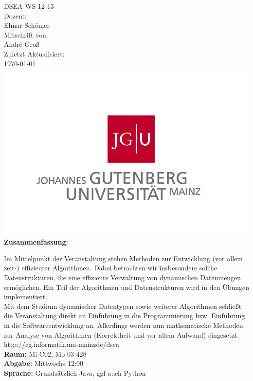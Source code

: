 \documentclass[a4paper,twoside,10pt]{report}
\begin{document}
\begin{titlepage}
\center
\Large DSEA WS 12-13\large \\[2em]
Dozent:\\Elmar Schömer\\[2em]
Mitschrift von:\\André Groß\\[2em]
Zuletzt Aktualisiert:\\\today\\
\includegraphics[scale=.2]{uni_logo.png}\\[3em]
\Large \textbf{Zusammenfassung:}\\[1em]
\parbox{0.75\textwidth}{\large
Im Mittelpunkt der Veranstaltung stehen Methoden zur Entwicklung (vor allem \mbox{zeit-)} effizienter Algorithmen. Dabei betrachten wir insbesondere solche Datenstrukturen, die eine effiziente Verwaltung von dynamischen Datenmengen ermöglichen. Ein Teil der Algorithmen und Datenstrukturen wird in den Übungen implementiert.\\[.5em]

Mit dem Studium dynamischer Datentypen sowie weiterer Algorithmen schließt die Veranstaltung direkt an Einführung in die Programmierung bzw. Einführung in die Softwareentwicklung an. Allerdings werden nun mathematische Methoden zur Analyse von Algorithmen (Korrektheit und vor allem Aufwand) eingesetzt.\\[.5em]

http://cg.informatik.uni-mainzde/dsea\\
\textbf{Raum:} Mi C02, Mo 03-428\\
\textbf{Abgabe:} Mittwochs 12:00\\
\textbf{Sprache:} Grundsätzlich Java, ggf auch Python
}
\end{titlepage}
\normalsize
\tableofcontents
\twocolumn
\end{document}
